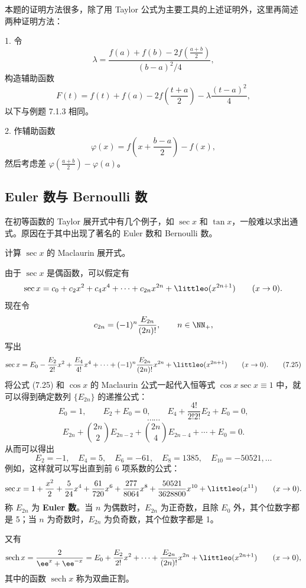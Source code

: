 \begin{xremark}
本题的证明方法很多，除了用 Taylor 公式为主要工具的上述证明外，这里再简述两种证明方法：

1. 令
\[
  \lambda=\frac{f(a)+f(b)-2f\left(\frac{a+b}{2}\right)}{(b-a)^2/4},
\]
构造辅助函数
\[
  F(t)=f(t)+f(a)-2f\left(\frac{t+a}{2}\right)-\lambda\frac{(t-a)^2}{4},
\]
以下与例题 7.1.3 相同。

2. 作辅助函数
\[
  \varphi(x)=f\left(x+\frac{b-a}{2}\right)-f(x),
\]
然后考虑差 $\varphi\left(\frac{a+b}{2}\right)-\varphi(a)$。
\end{xremark}

\subsection{Euler 数与 Bernoulli 数}

在初等函数的 Taylor 展开式中有几个例子，如 $\sec x$ 和 $\tan x$，一般难以求出通式。原因在于其中出现了著名的 Euler 数和 Bernoulli 数。

\begin{xexample}[7.2.7]
计算 $\sec x$ 的 Maclaurin 展开式。
\end{xexample}
\begin{xsolution}
由于 $\sec x$ 是偶函数，可以假定有
\[
  \sec x=c_0+c_2x^2+c_4x^4+\cdots+c_{2n}x^{2n}+\littleo(x^{2n+1})\qquad(x\to0).
\]
现在令
\[
  c_{2n}=(-1)^n\frac{E_{2n}}{(2n)!},\qquad n\in\NN_+,
\]
写出
\begin{equation}
  \sec x=E_0-\frac{E_2}{2!}x^2+\frac{E_4}{4!}x^4+\cdots+(-1)^n\frac{E_{2n}}{(2n)!}x^{2n}+\littleo(x^{2n+1})\qquad(x\to0).
  \tag{7.25}
\end{equation}
将公式 (7.25) 和 $\cos x$ 的 Maclaurin 公式一起代入恒等式 $\cos x\sec x\equiv1$ 中，就可以得到确定数列 $\{E_{2n}\}$ 的递推公式：
\[
  E_0=1,\qquad E_2+E_0=0,\qquad E_4+\frac{4!}{2!2!}E_2+E_0=0,
\]
\[
  \cdots\cdots
\]
\[
  E_{2n}+\binom{2n}{2}E_{2n-2}+\binom{2n}{4}E_{2n-4}+\cdots+E_0=0.
\]
从而可以得出
\[
  E_2=-1,\quad E_4=5,\quad E_6=-61,\quad E_8=1385,\quad E_{10}=-50521,\ldots
\]
例如，这样就可以写出直到前 6 项系数的公式：
\[
  \sec x=1+\frac{x^2}{2}+\frac{5}{24}x^4+\frac{61}{720}x^6+\frac{277}{8064}x^8+\frac{50521}{3628800}x^{10}+\littleo(x^{11})\qquad(x\to0).
\]
称 $E_{2n}$ 为 \textbf{Euler 数}。当 $n$ 为偶数时，$E_{2n}$ 为正奇数，且除 $E_0$ 外，其个位数字都是 5；当 $n$ 为奇数时，$E_{2n}$ 为负奇数，其个位数字都是 1。
\end{xsolution}

\begin{xremark}
又有
\[
  \operatorname{sech}x=\frac{2}{\ee^x+\ee^{-x}}
  =E_0+\frac{E_2}{2!}x^2+\cdots+\frac{E_{2n}}{(2n)!}x^{2n}+\littleo(x^{2n+1})\qquad(x\to0),
\]
其中的函数 $\operatorname{sech}x$ 称为双曲正割。
\end{xremark}


